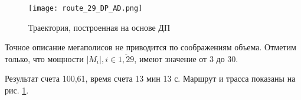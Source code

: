 \begin{figure}[H]
  \centering
  \texttt{[image: route\_29\_DP\_AD.png]}
  \caption{
    Траектория, построенная на основе ДП
  }
  \label{DP_Result}
\end{figure}

Точное описание мегаполисов не приводится по соображениям объема.
Отметим только, что мощности
$|M_i|, i\in \overline{1,29}$,
имеют значение от 3 до 30.

Результат счета 100,61,
время счета 13 мин 13 с.
Маршрут и трасса показаны
на рис. \ref{DP_Result}.
